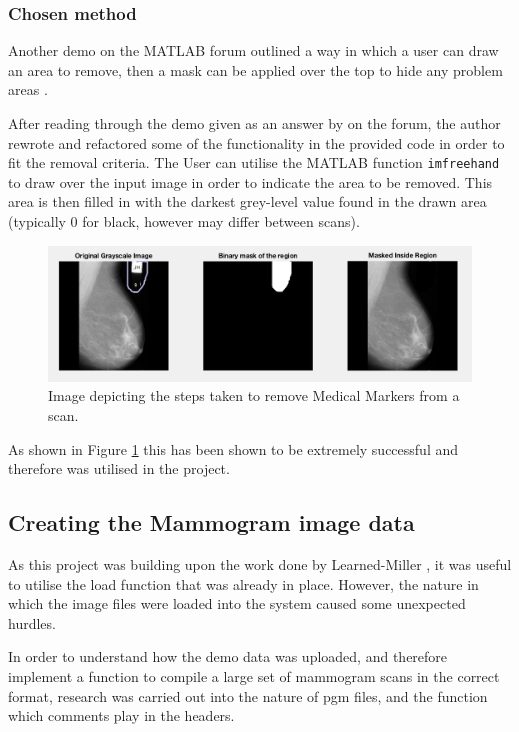 \subsubsection{Chosen method}

Another demo on the MATLAB forum outlined a way in which a user can draw an area to remove, then a mask can be applied over the top to hide any problem areas \cite{binary_mask}.

After reading through the demo given as an answer by  on the forum, the author rewrote and refactored some of the functionality in the provided code in order to fit the removal criteria. The User can utilise the MATLAB function \texttt{imfreehand} \cite{imfreehand} to draw over the input image in order to indicate the area to be removed. This area is then filled in with the darkest grey-level value found in the drawn area (typically 0 for black, however may differ between scans).

\begin{figure}[H]
  \centering
  \includegraphics[scale=0.4]{Chapter2/technical-img/draw-to-remove.png}
  \caption{Image depicting the steps taken to remove Medical Markers from a scan.}
  \label{fig:remove-marker}
\end{figure}

As shown in Figure \ref{fig:remove-marker} this has been shown to be extremely successful and therefore was utilised in the project.

\subsection{Creating the Mammogram image data}

As this project was building upon the work done by Learned-Miller \cite{joint-alignment}, it was useful to utilise the load function that was already in place. However, the nature in which the image files were loaded into the system caused some unexpected hurdles.

In order to understand how the demo data was uploaded, and therefore implement a function to compile a large set of mammogram scans in the correct format, research was carried out into the nature of \acrshort{pgm} files, and the function which comments play in the headers.


